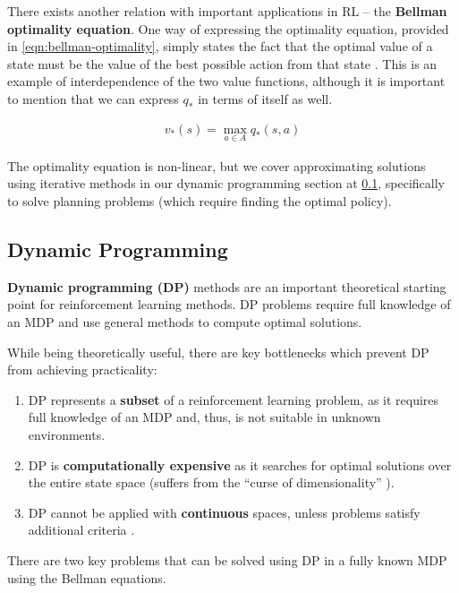 There exists another relation with important applications in RL -- the \textbf{Bellman optimality equation}.
One way of expressing the optimality equation, provided in \ref{eqn:bellman-optimality}, simply states the fact that the optimal value of a state must be the value of the best possible action from that state \cite{rlai}.
This is an example of interdependence of the two value functions, although it is important to mention that we can express $q_{*}$ in terms of itself as well.

\begin{equation} \label{eqn:bellman-optimality}
    \begin{aligned}
        v_*(s) = \max_{a \in A} q_{*}(s, a)
    \end{aligned}
\end{equation}

The optimality equation is non-linear, but we cover approximating solutions using iterative methods in our dynamic programming section at \ref{rl:dp}, specifically to solve planning problems (which require finding the optimal policy).

\subsection{Dynamic Programming} \label{rl:dp}
\textbf{Dynamic programming (DP)} methods are an important theoretical starting point for reinforcement learning methods. DP problems require full knowledge of an MDP and use general methods to compute optimal solutions.

While being theoretically useful, there are key bottlenecks which prevent DP from achieving practicality:

\begin{enumerate}
    \item DP represents a \textbf{subset} of a reinforcement learning problem, as it requires full knowledge of an MDP and, thus, is not suitable in unknown environments.
    \item DP is \textbf{computationally expensive} as it searches for optimal solutions over the entire state space (suffers from the ``curse of dimensionality'' \cite{rlai}).
    \item DP cannot be applied with \textbf{continuous} spaces, unless problems satisfy additional criteria \cite{rlai}.
\end{enumerate}

There are two key problems that can be solved using DP in a fully known MDP using the Bellman equations.

